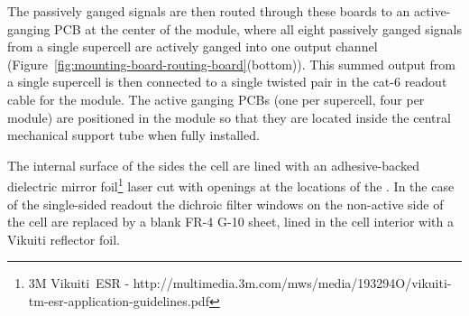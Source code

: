 The passively ganged signals are then routed through these boards to an active-ganging PCB at the center of the module, where all eight passively ganged signals from a single supercell are actively ganged into one output channel (Figure~\ref{fig:mounting-board-routing-board}(bottom)). This summed output from a single supercell is then connected to a single twisted pair in the cat-6 readout cable for the module.  The active ganging PCBs (one per supercell, four per module) are positioned in the module so that they are located inside the central  mechanical support tube when fully installed.



The  internal surface of the sides the cell are lined with an adhesive-backed dielectric mirror foil\footnote{3M Vikuiti\texttrademark\  ESR - http://multimedia.3m.com/mws/media/193294O/vikuiti-tm-esr-application-guidelines.pdf} laser cut with openings at the locations of the .  In the case of the single-sided readout the dichroic filter windows on the non-active side of the cell are replaced by a blank FR-4 G-10 sheet, lined in the cell interior with a Vikuiti reflector foil.

